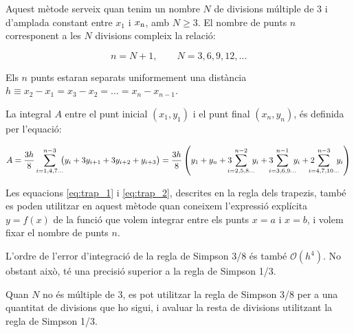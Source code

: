 Aquest mètode serveix quan tenim un nombre  $N$ de divisions múltiple de 3 i d'amplada constant entre $x_1$ i $x_\mathrm{n}$, amb $N \geq 3$.  El nombre de punts $n$ corresponent a les $N$ divisions  compleix la relació:

\begin{equation}
	n = N+1,\qquad N = 3, 6, 9, 12, \dots
\end{equation}
 
Els $n$ punts estaran separats uniformement una distància $h \equiv x_2-x_1 = x_3-x_2 = \dots = x_n-x_{n-1}$.

La integral $A$ entre el punt inicial $(x_1, y_1)$ i el punt final $(x_n, y_n)$, és definida per l'equació:

 \begin{equation}\label{eq:simp_3_8}
   A =  \frac{3h}{8} \sum_{i=1,4,7\dots}^{n-3} \hspace{-0.5em} \big( y_i + 3 y_{i+1} + 3 y_{i+2} + y_{i+3}\big) =
   \frac{3h}{8} \left( y_1 + y_n + 3 \hspace{-0.7em} \sum_{i=2,5,8\dots}^{n-2} \hspace{-0.5em} y_i +
   3 \hspace{-0.7em} \sum_{i=3,6,9\dots}^{n-1} \hspace{-0.5em} y_i
   + 2 \hspace{-0.9em} \sum_{i=4,7,10\dots}^{n-3} \hspace{-0.5em} y_i \right)
 \end{equation}

 Les equacions \eqref{eq:trap_1} i \eqref{eq:trap_2}, descrites en la regla dels trapezis, també es poden utilitzar en aquest mètode quan  coneixem l'expressió explícita $y=f(x)$ de la funció que volem integrar entre els punts $x=a$ i $x=b$, i volem fixar el nombre de punts $n$.

 L'ordre de l'error d'integració de la regla de Simpson 3/8 és també $\mathscr{O}(h^4)$. No obstant això, té una precisió superior a la regla de Simpson 1/3.
 
 Quan  $N$ no és múltiple de 3, es pot utilitzar la regla de Simpson 3/8 per a una quantitat de divisions que ho sigui, i avaluar la resta de divisions utilitzant la  regla de Simpson 1/3.


